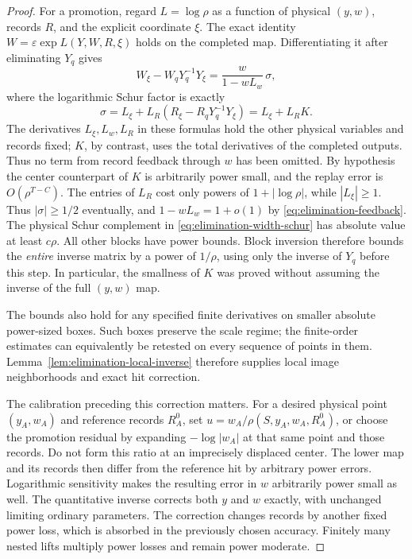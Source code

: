 \begin{proof}
For a promotion, regard $L=\log\rho$ as a function of physical
$(y,w)$, records $R$, and the explicit coordinate $\xi$.  The exact
identity $W=\varepsilon\exp L(Y,W,R,\xi)$ holds on the completed
map.  Differentiating it after eliminating $Y_q$ gives
\begin{equation}\label{eq:elimination-width-schur}
 W_\xi-W_qY_q^{-1}Y_\xi
   =\frac{w}{1-wL_w}\,\sigma,
\end{equation}
where the logarithmic Schur factor is exactly
\begin{equation}\label{eq:elimination-schur}
 \sigma=L_\xi+L_R
       (R_\xi-R_qY_q^{-1}Y_\xi)=L_\xi+L_RK.
\end{equation}
The derivatives $L_\xi,L_w,L_R$ in these formulas hold the other
physical variables and records fixed; $K$, by contrast, uses the
total derivatives of the completed outputs.  Thus no term from
record feedback through $w$ has been omitted.  By hypothesis the
center counterpart of $K$ is arbitrarily power
small, and the replay error is $O(\rho^{T-C})$.  The entries of $L_R$
cost only powers of $1+|\log\rho|$, while $|L_\xi|\ge1$.
Thus $|\sigma|\ge1/2$ eventually, and $1-wL_w=1+o(1)$ by
\eqref{eq:elimination-feedback}.  The physical Schur complement
in \eqref{eq:elimination-width-schur} has absolute value at least
$c\rho$.  All other blocks have power bounds.  Block inversion
therefore bounds the \emph{entire} inverse matrix by a power of
$1/\rho$, using only the inverse of $Y_q$ before this step.  In
particular, the smallness of $K$ was proved without assuming the
inverse of the full $(y,w)$ map.

The bounds also hold for any specified finite derivatives on smaller
absolute power-sized boxes.  Such boxes preserve the scale regime;
the finite-order estimates can equivalently be retested on every
sequence of points in them.  Lemma~\ref{lem:elimination-local-inverse}
therefore supplies local image neighborhoods and exact hit correction.

The calibration preceding this correction matters.  For a desired
physical point $(y_A,w_A)$ and reference records $R_A^0$, set
$u=w_A/\rho(S,y_A,w_A,R_A^0)$, or choose the promotion residual by
expanding $-\log|w_A|$ at that same point and those records.  Do not
form this ratio at an imprecisely displaced center.  The lower map and
its records then differ from the reference hit by arbitrary power
errors.  Logarithmic sensitivity makes the resulting error in $w$
arbitrarily power small as well.  The quantitative inverse corrects
both $y$ and $w$ exactly, with unchanged limiting ordinary parameters.
The correction changes records by another fixed power loss, which is
absorbed in the previously chosen accuracy.  Finitely many nested
lifts multiply power losses and remain power moderate.
\end{proof}

